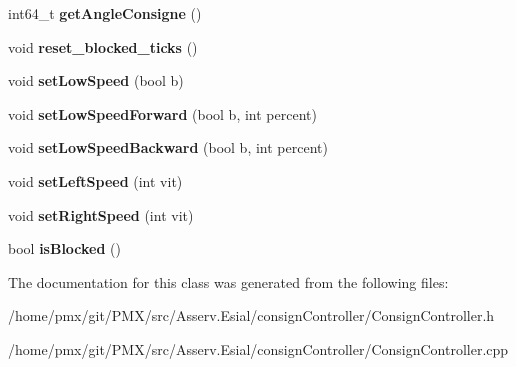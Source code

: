 \begin{DoxyCompactItemize}
int64\+\_\+t {\bfseries get\+Angle\+Consigne} ()
\item 
\mbox{\label{classConsignController_a3b0ccaf93a6e1e0f150d67c3571f0331}} 
void {\bfseries reset\+\_\+blocked\+\_\+ticks} ()
\item 
\mbox{\label{classConsignController_afa7727f7d04cbc501bffdd3b0ad36a05}} 
void {\bfseries set\+Low\+Speed} (bool b)
\item 
\mbox{\label{classConsignController_aafda5739beb7065cbecac6703b975a06}} 
void {\bfseries set\+Low\+Speed\+Forward} (bool b, int percent)
\item 
\mbox{\label{classConsignController_a27a9fc230e21a9d04dbb01258743a25a}} 
void {\bfseries set\+Low\+Speed\+Backward} (bool b, int percent)
\item 
\mbox{\label{classConsignController_af25e0be686ad3755c989c28e7ba72bd9}} 
void {\bfseries set\+Left\+Speed} (int vit)
\item 
\mbox{\label{classConsignController_a0689e440ff86fccb0ec47bc8d91c2dc7}} 
void {\bfseries set\+Right\+Speed} (int vit)
\item 
\mbox{\label{classConsignController_a760e03cdf7af09c8008ed9128b1a1ec7}} 
bool {\bfseries is\+Blocked} ()
\end{DoxyCompactItemize}


The documentation for this class was generated from the following files\+:\begin{DoxyCompactItemize}
\item 
/home/pmx/git/\+P\+M\+X/src/\+Asserv.\+Esial/consign\+Controller/Consign\+Controller.\+h\item 
/home/pmx/git/\+P\+M\+X/src/\+Asserv.\+Esial/consign\+Controller/Consign\+Controller.\+cpp\end{DoxyCompactItemize}
